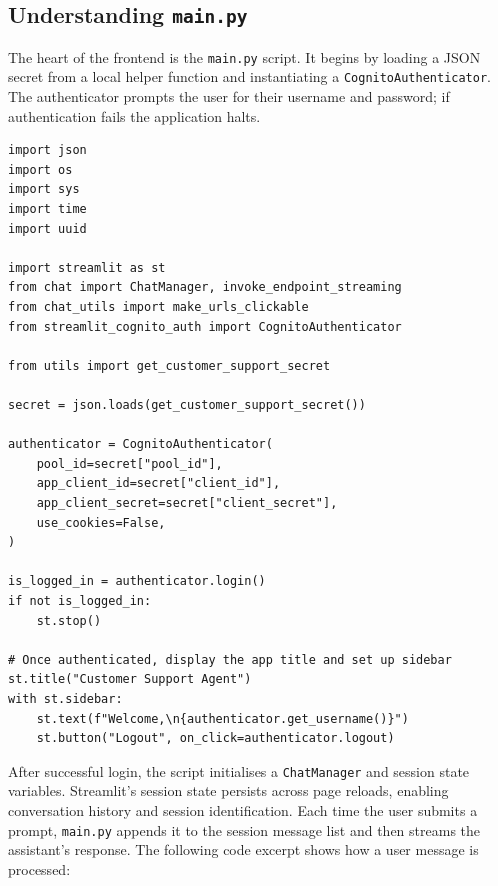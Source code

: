 \subsection{Understanding \texttt{main.py}}

The heart of the frontend is the \texttt{main.py} script.  It begins
by loading a JSON secret from a local helper function and instantiating
a \texttt{CognitoAuthenticator}.  The authenticator prompts the user
for their username and password; if authentication fails the
application halts.

\begin{lstlisting}
import json
import os
import sys
import time
import uuid

import streamlit as st
from chat import ChatManager, invoke_endpoint_streaming
from chat_utils import make_urls_clickable
from streamlit_cognito_auth import CognitoAuthenticator

from utils import get_customer_support_secret

secret = json.loads(get_customer_support_secret())

authenticator = CognitoAuthenticator(
    pool_id=secret["pool_id"],
    app_client_id=secret["client_id"],
    app_client_secret=secret["client_secret"],
    use_cookies=False,
)

is_logged_in = authenticator.login()
if not is_logged_in:
    st.stop()

# Once authenticated, display the app title and set up sidebar
st.title("Customer Support Agent")
with st.sidebar:
    st.text(f"Welcome,\n{authenticator.get_username()}")
    st.button("Logout", on_click=authenticator.logout)

\end{lstlisting}

After successful login, the script initialises a \texttt{ChatManager}
and session state variables.  Streamlit’s session state persists
across page reloads, enabling conversation history and session
identification.  Each time the user submits a prompt, \texttt{main.py}
appends it to the session message list and then streams the
assistant’s response.  The following code excerpt shows how a
user message is processed:

